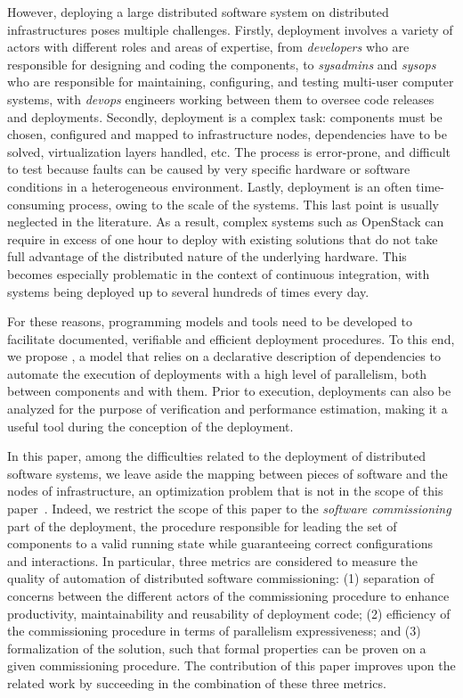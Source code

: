 However, deploying a large distributed software system on
distributed infrastructures poses multiple challenges. Firstly, deployment
involves a variety of actors with different roles and areas of
expertise, from \emph{developers} who are responsible for designing
and coding the components, to \emph{sysadmins} and \emph{sysops} who
are responsible for maintaining, configuring, and testing multi-user
computer systems, with \emph{devops} engineers working between them to
oversee code releases and deployments. Secondly, deployment is a
complex task: components must be chosen, configured and mapped to
infrastructure nodes, dependencies have to be solved, virtualization
layers handled, etc. The process is error-prone, and difficult to test
because faults can be caused by very specific hardware or software
conditions in a heterogeneous environment. Lastly, deployment is an
often time-consuming process, owing to the scale of the systems. This
last point is usually neglected in the literature. As a result,
complex systems such as OpenStack can require in excess of one hour to
deploy with existing solutions that do not take full advantage of the
distributed nature of the underlying hardware. This becomes especially
problematic in the context of continuous integration, with systems
being deployed up to several hundreds of times every day.

For these reasons, programming models and tools need to be developed
to facilitate documented, verifiable and efficient deployment
procedures. To this end, we propose \mad, a model that relies on a
declarative description of dependencies to automate the execution of
deployments with a high level of parallelism, both between components
and with them. Prior to execution, \mad deployments can also be
analyzed for the purpose of verification and performance estimation,
making it a useful tool during the conception of the deployment.

In this paper, among the difficulties related to the deployment of
distributed software systems, we leave aside the mapping between
pieces of software and the nodes of infrastructure, an optimization
problem that is not in the scope of this paper~\cite{6409358,
10.1007/978-3-319-47677-3_15, cadorel:hal-02165835, ccgridemile,
10.5555/2432523.2432528}. Indeed, we restrict the scope of this paper
to the \emph{software commissioning} part of the deployment, \ie the
procedure responsible for leading the set of components to a valid
running state while guaranteeing correct configurations and
interactions.  In particular, three metrics are considered to measure
the quality of automation of distributed software commissioning: (1)
separation of concerns between the different actors of the
commissioning procedure to enhance productivity, maintainability and
reusability of deployment code; (2) efficiency of the commissioning
procedure in terms of parallelism expressiveness; and (3)
formalization of the solution, such that formal properties can be
proven on a given commissioning procedure. The contribution of this
paper improves upon the related work by succeeding in the combination
of these three metrics.

